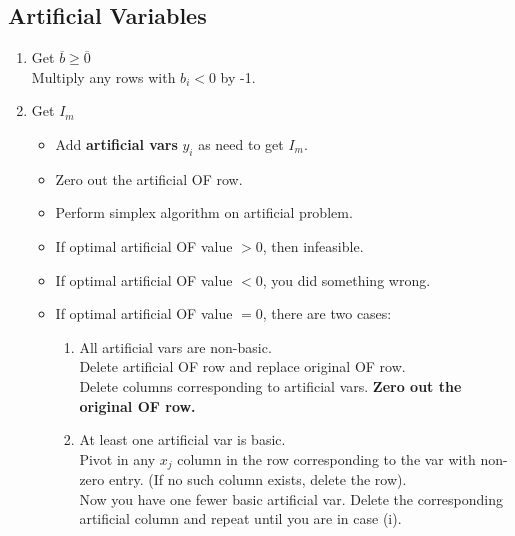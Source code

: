 \documentclass[10pt]{article}
\begin{document}
\begin{multicols*}{2}
\begin{minipage}{\columnwidth}
        \subsection*{Artificial Variables}
        \begin{enumerate}
            \item Get \(\overline{b} \geq \overline{0}\) \\
                  Multiply any rows with \(b_i < 0\) by -1.
            \item Get \(I_m\)
                  \begin{itemize}
                      \item Add \textbf{artificial vars} \(y_i\) as need to get \(I_m\).
                      \item Zero out the artificial OF row.
                      \item Perform simplex algorithm on artificial problem.
                      \item If optimal artificial OF value \(> 0\), then infeasible.
                      \item If optimal artificial OF value \(< 0\), you did something wrong.
                      \item If optimal artificial OF value \(= 0\), there are two cases:
                            \begin{enumerate}[label=(\roman*)]
                                \item All artificial vars are non-basic. \\
                                      Delete artificial OF row and replace original OF row. \\
                                      Delete columns corresponding to artificial vars.
                                      \textbf{Zero out the original OF row.}
                                \item At least one artificial var is basic. \\
                                      Pivot in any \(x_j\) column in the row corresponding to the var with non-zero entry. (If no such column exists, delete the row). \\
                                      Now you have one fewer basic artificial var. Delete the corresponding artificial column and repeat until you are in case (i).
                            \end{enumerate}
                  \end{itemize}
        \end{enumerate}
    \end{minipage}
\end{multicols*}
\end{document}
